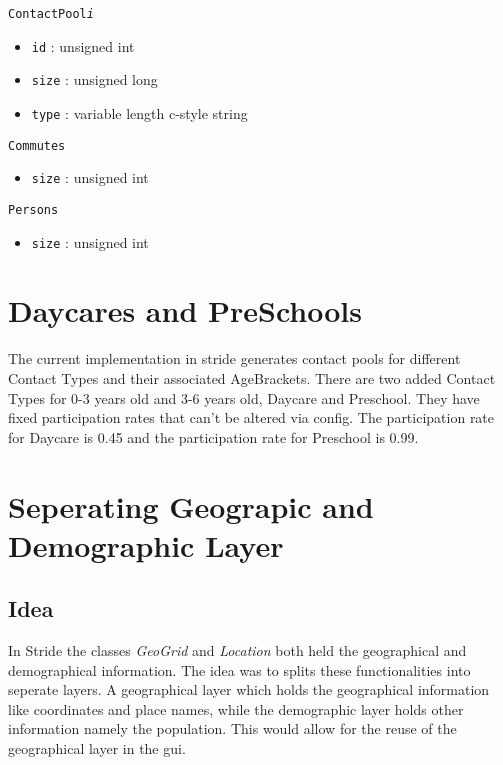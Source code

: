 \texttt{ContactPool\textit{i}}
\begin{itemize}
\item \texttt{id} : unsigned int 
\item \texttt{size} : unsigned long 
\item \texttt{type} : variable length c-style string
\end{itemize}

\texttt{Commutes}
\begin{itemize}
\item \texttt{size} : unsigned int
\end{itemize}

\texttt{Persons}
\begin{itemize}
\item \texttt{size} : unsigned int
\end{itemize}

\section{Daycares and PreSchools}
\label{section:Dataycares and PreSchools}
The current implementation in stride generates contact pools for different Contact Types and their associated AgeBrackets. There are two added Contact Types for 0-3 years old and 3-6 years old, Daycare and Preschool. They have fixed participation rates that can't be altered via config. The participation rate for Daycare is 0.45 and the participation rate for Preschool is 0.99.

\section{Seperating Geograpic and Demographic Layer}
\subsection{Idea}
In Stride the classes \textit{GeoGrid} and \textit{Location} both held the geographical and demographical information. The idea was to splits these functionalities into seperate layers. A geographical layer which holds the geographical information like coordinates and place names, while the demographic layer holds other information namely the population. This would allow for the reuse of the geographical layer in the gui.\\

